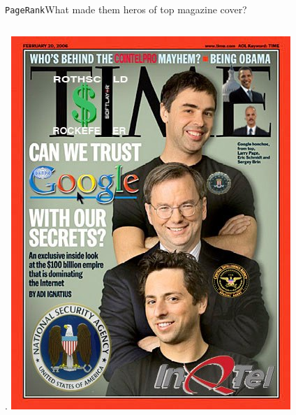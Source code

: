 \documentclass[xcolor=table,final]{beamer} %
\newcommand{\PageRank}{\texttt{PageRank}\xspace}
\begin{document}
\begin{frame}{\PageRank}{What made them heros of top magazine cover?}
\begin{columns}
    .
    \includegraphics[width=1.\textwidth]{figs/extras/brin-page-time}
  \end{columns}
\end{frame}
\end{document}
